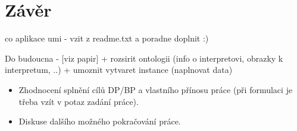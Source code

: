 \chapter{Závěr}

co aplikace umi - vzit z readme.txt a poradne doplnit :)


Do budoucna - [viz papir]
+ rozsirit ontologii (info o interpretovi, obrazky k interpretum, ..)
+ umoznit vytvaret instance (naplnovat data)

\begin{itemize}
\item Zhodnocení splnění cílů DP/BP a  vlastního přínosu práce (při formulaci je třeba vzít v potaz zadání práce).
\item Diskuse dalšího možného pokračování práce.
\end{itemize} 